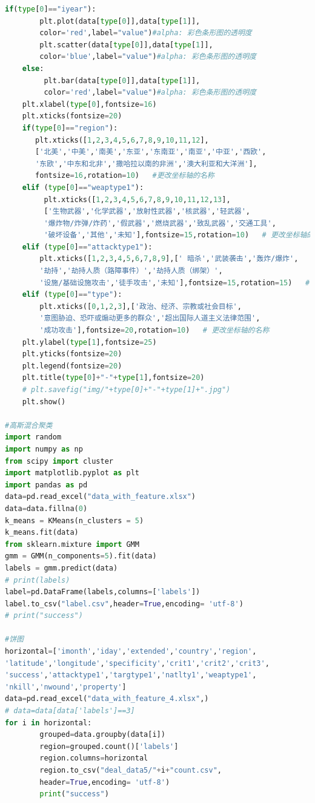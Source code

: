\documentclass[bwprint]{gmcmthesis}
\begin{document}
\begin{lstlisting}[language=Python]
    if(type[0]=="iyear"):
        plt.plot(data[type[0]],data[type[1]],
        color='red',label="value")#alpha: 彩色条形图的透明度
        plt.scatter(data[type[0]],data[type[1]],
        color='blue',label="value")#alpha: 彩色条形图的透明度
    else:
         plt.bar(data[type[0]],data[type[1]],
         color='red',label="value")#alpha: 彩色条形图的透明度
    plt.xlabel(type[0],fontsize=16)
    plt.xticks(fontsize=20)
    if(type[0]=="region"):
       plt.xticks([1,2,3,4,5,6,7,8,9,10,11,12],
       ['北美','中美','南美','东亚','东南亚','南亚','中亚','西欧',
       '东欧','中东和北非','撒哈拉以南的非洲','澳大利亚和大洋洲'],
       fontsize=16,rotation=10)   #更改坐标轴的名称
    elif (type[0]=="weaptype1"):
         plt.xticks([1,2,3,4,5,6,7,8,9,10,11,12,13],
         ['生物武器','化学武器','放射性武器','核武器','轻武器',
         '爆炸物/炸弹/炸药','假武器','燃烧武器','致乱武器','交通工具',
         '破坏设备','其他','未知'],fontsize=15,rotation=10)   # 更改坐标轴的名称
    elif (type[0]=="attacktype1"):
        plt.xticks([1,2,3,4,5,6,7,8,9],[' 暗杀','武装袭击','轰炸/爆炸',
        '劫持','劫持人质（路障事件）','劫持人质（绑架）',
        '设施/基础设施攻击','徒手攻击','未知'],fontsize=15,rotation=15)   # 更改坐标轴的名称
    elif (type[0]=="type"):
        plt.xticks([0,1,2,3],['政治、经济、宗教或社会目标',
        '意图胁迫、恐吓或煽动更多的群众','超出国际人道主义法律范围',
        '成功攻击'],fontsize=20,rotation=10)   # 更改坐标轴的名称
    plt.ylabel(type[1],fontsize=25)
    plt.yticks(fontsize=20)
    plt.legend(fontsize=20)
    plt.title(type[0]+"-"+type[1],fontsize=20)
    # plt.savefig("img/"+type[0]+"-"+type[1]+".jpg")
    plt.show()

#高斯混合聚类
import random
import numpy as np
from scipy import cluster
import matplotlib.pyplot as plt
import pandas as pd
data=pd.read_excel("data_with_feature.xlsx")
data=data.fillna(0)
k_means = KMeans(n_clusters = 5)
k_means.fit(data)
from sklearn.mixture import GMM
gmm = GMM(n_components=5).fit(data)
labels = gmm.predict(data)
# print(labels)
label=pd.DataFrame(labels,columns=['labels'])
label.to_csv("label.csv",header=True,encoding= 'utf-8')
# print("success")

#饼图
horizontal=['imonth','iday','extended','country','region',
'latitude','longitude','specificity','crit1','crit2','crit3',
'success','attacktype1','targtype1','natlty1','weaptype1',
'nkill','nwound','property']
data=pd.read_excel("data_with_feature_4.xlsx",)
# data=data[data['labels']==3]
for i in horizontal:
        grouped=data.groupby(data[i])
        region=grouped.count()['labels']
        region.columns=horizontal
        region.to_csv("deal_data5/"+i+"count.csv",
        header=True,encoding= 'utf-8')
        print("success")


\end{lstlisting}
\end{document}
